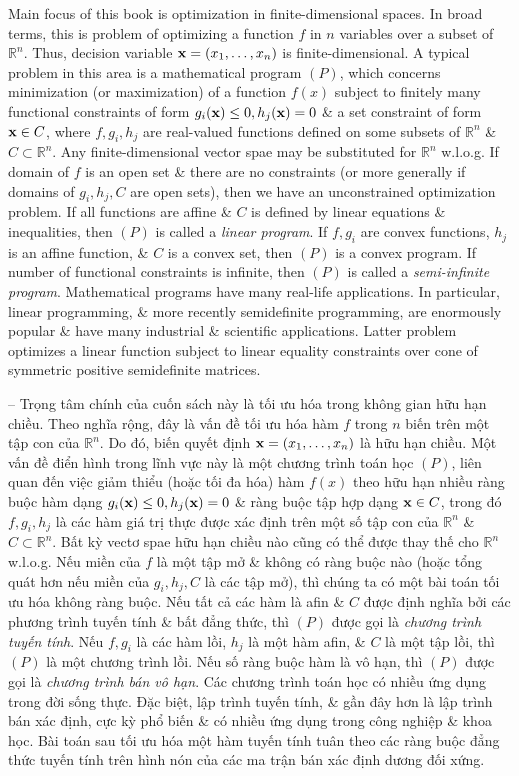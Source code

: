 \documentclass{article}
\begin{document}
\begin{itemize}
    Main focus of this book is optimization in finite-dimensional spaces. In broad terms, this is problem of optimizing a function $f$ in $n$ variables over a subset of $\mathbb{R}^n$. Thus, decision variable ${\bf x} = (x_1,\ldots,x_n)$ is finite-dimensional. A typical problem in this area is a mathematical program $(P)$, which concerns minimization (or maximization) of a function $f(x)$ subject to finitely many functional constraints of form $g_i({\bf x})\le0,h_j({\bf x}) = 0$ \& a set constraint of form ${\bf x}\in C$, where $f,g_i,h_j$ are real-valued functions defined on some subsets of $\mathbb{R}^n$ \& $C\subset\mathbb{R}^n$. Any finite-dimensional vector spae may be substituted for $\mathbb{R}^n$ w.l.o.g. If domain of $f$ is an open set \& there are no constraints (or more generally if domains of $g_i,h_j,C$ are open sets), then we have an unconstrained optimization problem. If all functions are affine \& $C$ is defined by linear equations \& inequalities, then $(P)$ is called a {\it linear program}. If $f,g_i$ are convex functions, $h_j$ is an affine function, \& $C$ is a convex set, then $(P)$ is a convex program. If number of functional constraints is infinite, then $(P)$ is called a {\it semi-infinite program}. Mathematical programs have many real-life applications. In particular, linear programming, \& more recently semidefinite programming, are enormously popular \& have many industrial \& scientific applications. Latter problem optimizes a linear function subject to linear equality constraints over cone of symmetric positive semidefinite matrices.

    -- Trọng tâm chính của cuốn sách này là tối ưu hóa trong không gian hữu hạn chiều. Theo nghĩa rộng, đây là vấn đề tối ưu hóa hàm $f$ trong $n$ biến trên một tập con của $\mathbb{R}^n$. Do đó, biến quyết định ${\bf x} = (x_1,\ldots,x_n)$ là hữu hạn chiều. Một vấn đề điển hình trong lĩnh vực này là một chương trình toán học $(P)$, liên quan đến việc giảm thiểu (hoặc tối đa hóa) hàm $f(x)$ theo hữu hạn nhiều ràng buộc hàm dạng $g_i({\bf x})\le0,h_j({\bf x}) = 0$ \& ràng buộc tập hợp dạng ${\bf x}\in C$, trong đó $f,g_i,h_j$ là các hàm giá trị thực được xác định trên một số tập con của $\mathbb{R}^n$ \& $C\subset\mathbb{R}^n$. Bất kỳ vectơ spae hữu hạn chiều nào cũng có thể được thay thế cho $\mathbb{R}^n$ w.l.o.g. Nếu miền của $f$ là một tập mở \& không có ràng buộc nào (hoặc tổng quát hơn nếu miền của $g_i,h_j,C$ là các tập mở), thì chúng ta có một bài toán tối ưu hóa không ràng buộc. Nếu tất cả các hàm là afin \& $C$ được định nghĩa bởi các phương trình tuyến tính \& bất đẳng thức, thì $(P)$ được gọi là {\it chương trình tuyến tính}. Nếu $f,g_i$ là các hàm lồi, $h_j$ là một hàm afin, \& $C$ là một tập lồi, thì $(P)$ là một chương trình lồi. Nếu số ràng buộc hàm là vô hạn, thì $(P)$ được gọi là {\it chương trình bán vô hạn}. Các chương trình toán học có nhiều ứng dụng trong đời sống thực. Đặc biệt, lập trình tuyến tính, \& gần đây hơn là lập trình bán xác định, cực kỳ phổ biến \& có nhiều ứng dụng trong công nghiệp \& khoa học. Bài toán sau tối ưu hóa một hàm tuyến tính tuân theo các ràng buộc đẳng thức tuyến tính trên hình nón của các ma trận bán xác định dương đối xứng.


\end{itemize}
\end{document}
